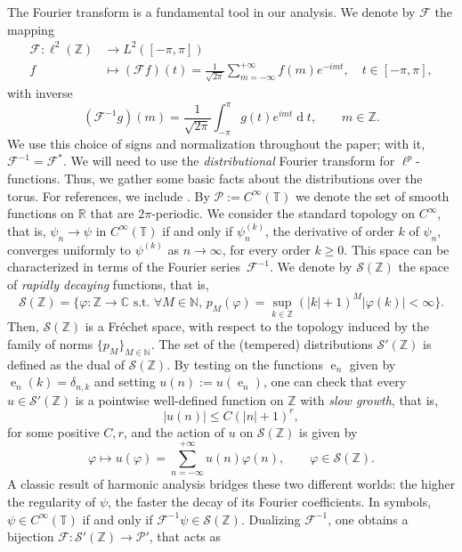 \documentclass[12pt,a4paper,reqno]{amsart}
\theoremstyle{definition}
\theoremstyle{definition}\newtheorem{defn}[thm]{Definition}
\begin{document}
    The Fourier transform is a fundamental tool in our analysis. We denote by $\mathcal F$ the mapping
    \begin{align*}
    \mathcal{F}\colon \ell^2(\mathbb{Z})&\to L^2([-\pi,\pi])\\
    f &\mapsto (\mathcal F f)(t)=\frac{1}{\sqrt{2\pi}}\sum_{m=-\infty}^{+\infty}f(m) e^{-imt},\quad t\in[-\pi,\pi],
    \end{align*}
    with inverse
    \[
    (\mathcal{F}^{-1}g)(m)=\frac{1}{\sqrt{2\pi}}\int_{-\pi}^{\pi}g(t)e^{imt}\operatorname{d}\!t, \qquad m\in\mathbb{Z}.
    \]
    We use this choice of signs and normalization throughout the paper; with it, $\mathcal F^{-1}=\mathcal F^*$. We will need to use the \emph{distributional} Fourier transform for $\ell^p$-functions. Thus, we gather some basic facts about the distributions over the torus. For references, we include \cite{beals,distributionsRT,hormander1983analysis}. By $\mathcal{P}:=C^\infty(\mathbb{T})$ we denote the set of smooth functions on $\mathbb{R}$ that are $2\pi$-periodic. We consider the standard topology on $C^\infty$, that is, $\psi_n\to\psi$ in $C^\infty(\mathbb{T})$ if and only if $\psi_n^{(k)}$, the derivative of order $k$ of $\psi_n$, converges uniformly to $\psi^{(k)}$ as $n\to\infty$, for every order $k\geqslant0.$ This space can be characterized in terms of the Fourier series~\(\mathcal{F}^{-1}.\)
    We denote by $\mathcal{S}(\mathbb{Z})$ the space of \emph{rapidly decaying}  functions, that is,
    \[
    \mathcal S(\mathbb Z)=\Big\{\varphi:\mathbb Z\to \mathbb C\textrm{ s.t. }\forall M\in\mathbb N,\,  p_M(\varphi)=\sup_{k\in\mathbb{Z}}(|k|+1)^{M}|\varphi(k)|<\infty \Big\}.
    \]
    Then, $\mathcal{S}(\mathbb{Z})$ is a Fréchet space, with respect to the topology induced by the family of norms $\{p_M\}_{M\in\mathbb{N}}$. 
     The set of the (tempered) distributions $\mathcal{S}'(\mathbb{Z})$ is defined as the dual of $\mathcal{S}(\mathbb{Z})$. By testing on the functions $\operatorname{e}_n$ given by $\operatorname{e}_n(k)=\delta_{n,k}$ and setting $u(n):=u(\operatorname{e}_n)$, one can check that every $u\in\mathcal{S}'(\mathbb{Z})$ is a pointwise well-defined function on $\mathbb{Z}$ with \emph{slow growth}, that is,
     \[
     |u(n)|\leqslant C(|n|+1)^r,
     \]
     for some positive $C,r$, and the action of $u$ on $\mathcal{S}(\mathbb{Z})$ is given by
    \[
    \varphi \mapsto u(\varphi)=\sum_{n=-\infty}^{+\infty} u(n)\varphi(n), \qquad \varphi\in\mathcal{S}(\mathbb{Z}).
    \]
    A classic result of harmonic analysis bridges these two different worlds: the higher the regularity of $\psi$, the faster the decay of its Fourier coefficients. In symbols, $\psi\in C^\infty(\mathbb{T})$ if and only if $\mathcal{F}^{-1}\psi\in\mathcal{S}(\mathbb{Z})$. Dualizing $\mathcal{F}^{-1}$, one obtains a bijection $\mathcal{F}\colon \mathcal{S}'(\mathbb{Z})\to\mathcal{P}'$, that acts as
    
\end{document}
